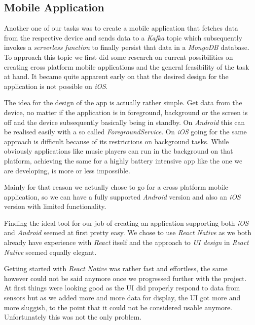 \subsection{Mobile Application}

Another one of our tasks was to create a mobile application that fetches data from the respective
device and sends data to a \textit{Kafka} topic which subsequently invokes a \textit{serverless
function} to finally persist that data in a \textit{MongoDB} database. To approach this topic we
first did some research on current possibilities on creating cross platform mobile applications and
the general feasibility of the task at hand. It became quite apparent early on that the desired
design for the application is not possible on \textit{iOS}.

The idea for the design of the app is actually rather simple. Get data from the device, no matter if
the application is in foreground, background or the screen is off and the device subsequently
basically being in standby. On \textit{Android} this can be realised easily with a so called
\textit{ForegroundService}. On \textit{iOS} going for the same approach is difficult because of its
restrictions on background tasks. While obviously applications like music players can run in the
background on that platform, achieving the same for a highly battery intensive app like the one we
are developing, is more or less impossible.

Mainly for that reason we actually chose to go for a cross platform mobile application, so we can
have a fully supported \textit{Android} version and also an \textit{iOS} version with limited
functionality.

Finding the ideal tool for our job of creating an application supporting both \textit{iOS} and
\textit{Android} seemed at first pretty easy. We chose to use \textit{React Native}
\cite{react-native} as we both already have experience with \textit{React} \cite{react} itself and
the approach to \textit{UI design} in \textit{React Native} seemed equally elegant.

Getting started with \textit{React Native} was rather fast and effortless, the same however could
not be said anymore once we progressed further with the project. At first things were looking good
as the UI did properly respond to data from sensors but as we added more and more data for
display, the UI got more and more sluggish, to the point that it could not be considered usable
anymore. Unfortunately this was not the only problem.


